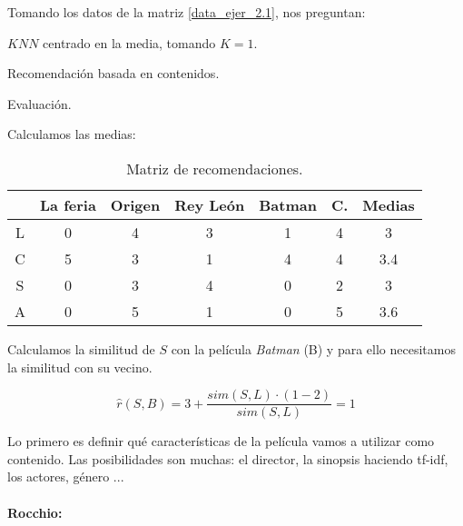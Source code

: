 \begin{problem}[?]
\label{ejer:2.1}

Tomando los datos de la matriz \ref{data_ejer_2.1}, nos preguntan:


\ppart $KNN$ centrado en la media, tomando $K=1$.

\ppart Recomendación basada en contenidos.

\ppart Evaluación.


\solution

\spart 
Calculamos las medias:

\begin{table}[hbtp]
\centering
\begin{tabular}{c|ccccc||c}
&La feria & Origen & Rey León & Batman & C. & Medias\\\hline
L&0&4&3&1&4&3\\
C&5&3&1&4&4&3.4\\
S&0&3&4&0&2&3\\
A&0&5&1&0&5&3.6
\end{tabular}
\caption{Matriz de recomendaciones.}
\end{table}

Calculamos la similitud de $S$ con la película \textit{Batman} (B) y para ello necesitamos la similitud con su vecino.

\[
	\hat{r}(S,B) = 3 + \frac{sim(S,L)·(1-2)}{sim(S,L)} = 1
\]

\spart Lo primero es definir qué características de la película vamos a utilizar como contenido. Las posibilidades son muchas: el director, la sinopsis haciendo tf-idf, los actores, género ...

\paragraph{Rocchio:}


\end{problem}
